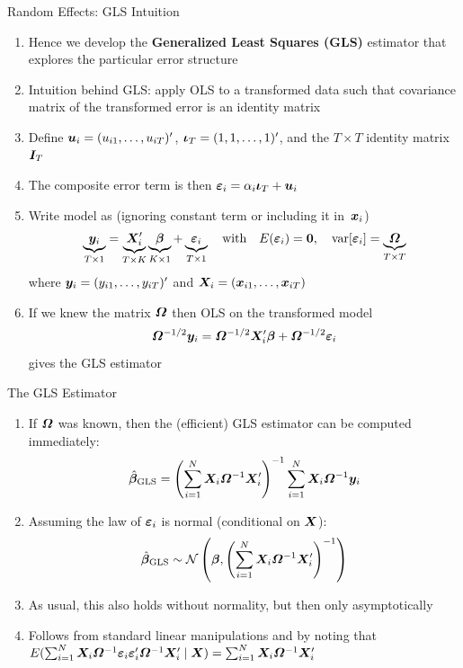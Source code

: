 \documentclass[english, professionalfonts,smaller,xcolor=dvipsnames]{beamer}
\begin{document}
\begin{frame}{Random Effects: GLS Intuition}
\begin{enumerate}
\item[$\Rightarrow$] Hence we develop the {\bf Generalized Least Squares (GLS)} estimator that explores the particular error structure
\item[$\Rightarrow$] Intuition behind GLS: apply OLS to a transformed data such that covariance matrix of the transformed error is an identity matrix
\item[$\Rightarrow$] Define $\bm u_i = (u_{i1},\ldots,u_{iT})'$, $\bm \iota_T = (1,1,\ldots,1)'$, and the $T\times T$ identity matrix~$\bm I_T$
\item[$\Rightarrow$] The composite error term is then $\bm \varepsilon_i = \alpha_i \bm \iota_T +\bm u_i$
\item[$\Rightarrow$] Write model as (ignoring constant term or including it in~$\bm x_i$)
$$
\underbrace{\bm y_i}_{T\times 1} = \underbrace{\bm X_i'}_{T\times K}\underbrace{\bm \beta}_{K\times 1}+\underbrace{\bm \varepsilon_i}_{T\times 1}
\quad \text{with} \quad E(\bm \varepsilon_i) = \boldsymbol{0} ,
\quad \operatorname{var}[\bm \varepsilon_i] = \underbrace{\bm \varOmega}_{T\times T}
$$
where $\bm y_i = (y_{i1},\ldots,y_{iT})'$ and $\bm X_i = (\bm x_{i1},\ldots,\bm x_{iT})$
\item[$\Rightarrow$] If we knew the matrix $\bm \varOmega$ then OLS on the transformed model
$$
\bm \varOmega^{-1/2}\bm y_i = \bm \varOmega^{-1/2}\bm X_i'\bm \beta + \bm \varOmega^{-1/2}\bm \varepsilon_i 
$$
gives the GLS estimator
\end{enumerate}
\end{frame}

\begin{frame}{The GLS Estimator}
\begin{enumerate}
\item[$\Rightarrow$] If $\bm \varOmega$ was known, then the (efficient) GLS estimator can be computed immediately:
$$
\hat{\bm \beta}_{\text{GLS}} = \left(\sum_{i=1}^N \bm X_i \bm \varOmega^{-1} \bm X_i'\right)^{-1} \sum_{i=1}^N \bm X_i \bm \varOmega^{-1} \bm y_i 
$$
\item[$\Rightarrow$] Assuming the law of $\bm \varepsilon_i$ is normal (conditional on $\bm X$):
$$
\hat{\bm \beta}_{\text{GLS}} \sim \mathcal{N} \left( \bm \beta , \left(\sum_{i=1}^N \bm X_i \bm \varOmega^{-1} \bm X_i' \right)^{-1}\right)
$$
\item[$\Rightarrow$] As usual, this also holds without normality, but then only asymptotically 
\item[$\Rightarrow$] Follows from standard linear manipulations and by noting that $E(\sum_{i=1}^N \bm X_i \bm \varOmega^{-1} \bm \varepsilon_i \bm \varepsilon_i' \bm \varOmega^{-1} \bm X_i' \mid \bm X) =\sum_{i=1}^N \bm X_i \bm \varOmega^{-1} \bm X_i'$
\end{enumerate}
\end{frame}
\end{document}
